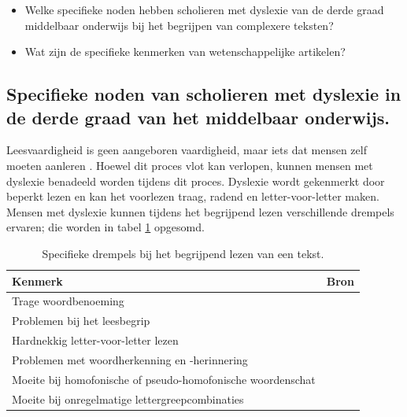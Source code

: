 \begin{itemize}
	\item Welke specifieke noden hebben scholieren met dyslexie van de derde graad middelbaar onderwijs bij het begrijpen van complexere teksten?
	\item Wat zijn de specifieke kenmerken van wetenschappelijke artikelen?
\end{itemize}

\subsection{Specifieke noden van scholieren met dyslexie in de derde graad van het middelbaar onderwijs.}

Leesvaardigheid is geen aangeboren vaardigheid, maar iets dat mensen zelf moeten aanleren \autocite{Bonte2020, VanDerMeer2022}. Hoewel dit proces vlot kan verlopen, kunnen mensen met dyslexie benadeeld worden tijdens dit proces.  Dyslexie wordt gekenmerkt door beperkt lezen en kan het voorlezen traag, radend en letter-voor-letter maken. Mensen met dyslexie kunnen tijdens het begrijpend lezen verschillende drempels ervaren; die worden in tabel \ref{table:dyslexia-hurdles} opgesomd.

\begin{center}
	\begin{table}[H]
	\begin{tabular}{ | m{9cm} | m{6cm} | } 
		\hline
		\textbf{Kenmerk} & \textbf{Bron} \\ 
		\hline
		Trage woordbenoeming &  \autocite{Bonte2020} \\
		\hline
		Problemen bij het leesbegrip & \autocite{Gala2016, Bonte2020} \\ 
		\hline
		Hardnekkig letter-voor-letter lezen & \autocite{Bonte2020, Zhang2021} \\ 
		\hline
		Problemen met woordherkenning en -herinnering & \autocite{Bonte2020} \\
		\hline
		Moeite bij homofonische of pseudo-homofonische woordenschat & \autocite{Zhang2021} \\
		\hline
		Moeite bij onregelmatige lettergreepcombinaties & \textcite{Gala2016} \\
		\hline
	\end{tabular}
	\caption{Specifieke drempels bij het begrijpend lezen van een tekst.}
	\label{table:dyslexia-hurdles}
	\end{table}
\end{center}

